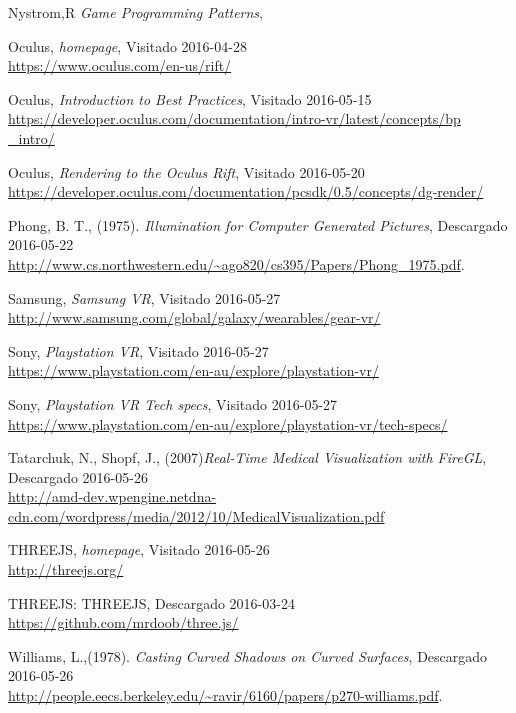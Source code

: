 \documentclass[12pt]{article}
\begin{document}
\begin{thebibliography}{9}
Nystrom,R \textit{Game Programming Patterns},

Oculus, \textit{homepage},
Visitado 2016-04-28
\\\url{https://www.oculus.com/en-us/rift/}

Oculus, \textit{Introduction to Best Practices},
Visitado 2016-05-15
\\\url{https://developer.oculus.com/documentation/intro-vr/latest/concepts/bp	
_intro/}

Oculus, \textit{Rendering to the Oculus Rift},
Visitado 2016-05-20
\\\url{https://developer.oculus.com/documentation/pcsdk/0.5/concepts/dg-render/}

Phong, B. T., (1975). \textit{Illumination for Computer Generated Pictures},
Descargado 2016-05-22
\\\url{http://www.cs.northwestern.edu/~ago820/cs395/Papers/Phong_1975.pdf}.  

Samsung, \textit{Samsung VR},
Visitado 2016-05-27
\\\url{http://www.samsung.com/global/galaxy/wearables/gear-vr/}

Sony, \textit{ Playstation VR},
Visitado 2016-05-27
\\\url{https://www.playstation.com/en-au/explore/playstation-vr/}

Sony, \textit{ Playstation VR Tech specs},
Visitado 2016-05-27
\\\url{https://www.playstation.com/en-au/explore/playstation-vr/tech-specs/}

Tatarchuk, N., Shopf, J., (2007)\textit{Real-Time Medical Visualization with FireGL},
Descargado 2016-05-26
\\\url{http://amd-dev.wpengine.netdna-cdn.com/wordpress/media/2012/10/MedicalVisualization.pdf}

THREEJS, \textit{homepage},
Visitado 2016-05-26
\\\url{http://threejs.org/}

THREEJS: THREEJS,
Descargado 2016-03-24
\\\url{https://github.com/mrdoob/three.js/}

Williams, L.,(1978). \textit{Casting Curved Shadows on Curved Surfaces},
Descargado 2016-05-26
\\\url{http://people.eecs.berkeley.edu/~ravir/6160/papers/p270-williams.pdf}. 

\end{thebibliography}
\end{document}
